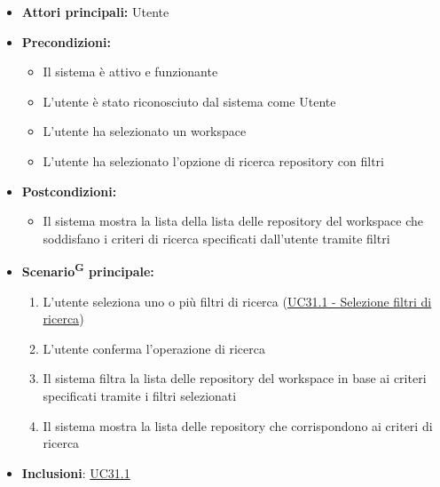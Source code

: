 \documentclass[a4paper, 11pt]{article}
\begin{document}
\begin{itemize}
	\item \textbf{Attori principali:} Utente
	\item \textbf{Precondizioni:}
	\begin{itemize}
		\item Il sistema è attivo e funzionante
		\item L'utente è stato riconosciuto dal sistema come Utente
		\item L'utente ha selezionato un workspace
		\item L'utente ha selezionato l'opzione di ricerca repository con filtri
	\end{itemize}
	\item \textbf{Postcondizioni:}
	\begin{itemize}
		\item Il sistema mostra la lista della lista delle repository del workspace che soddisfano i criteri di ricerca specificati dall'utente tramite filtri
	\end{itemize}
	\item \textbf{Scenario\textsuperscript{G} principale:}
	\begin{enumerate}
		\item L'utente seleziona uno o più filtri di ricerca (\hyperref[UC31.1]{UC31.1 - Selezione filtri di ricerca})
		\item L'utente conferma l'operazione di ricerca
		\item Il sistema filtra la lista delle repository del workspace in base ai criteri specificati tramite i filtri selezionati
		\item Il sistema mostra la lista delle repository che corrispondono ai criteri di ricerca
	\end{enumerate}
	\item \textbf{Inclusioni}: \hyperref[UC31.1]{UC31.1}
\end{itemize}
\end{document}

